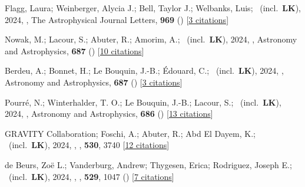 \item[{\color{numcolor}\scriptsize111}] Flagg, Laura; Weinberger, Alycia J.; Bell, Taylor J.; Welbanks, Luis; \etal\ (incl.\ \textbf{LK}), 2024, , The Astrophysical Journal Letters, \textbf{969} () [\href{https://ui.adsabs.harvard.edu/abs/2024ApJ...969L..19F}{3 citations}]

\item[{\color{numcolor}\scriptsize110}] Nowak, M.; Lacour, S.; Abuter, R.; Amorim, A.; \etal\ (incl.\ \textbf{LK}), 2024, , Astronomy and Astrophysics, \textbf{687} () [\href{https://ui.adsabs.harvard.edu/abs/2024A&A...687A.248N}{10 citations}]

\item[{\color{numcolor}\scriptsize109}] Berdeu, A.; Bonnet, H.; Le Bouquin, J.-B.; {\'E}douard, C.; \etal\ (incl.\ \textbf{LK}), 2024, , Astronomy and Astrophysics, \textbf{687} () [\href{https://ui.adsabs.harvard.edu/abs/2024A&A...687A.157B}{3 citations}]

\item[{\color{numcolor}\scriptsize108}] Pourr{\'e}, N.; Winterhalder, T. O.; Le Bouquin, J.-B.; Lacour, S.; \etal\ (incl.\ \textbf{LK}), 2024, , Astronomy and Astrophysics, \textbf{686} () [\href{https://ui.adsabs.harvard.edu/abs/2024A&A...686A.258P}{13 citations}]

\item[{\color{numcolor}\scriptsize107}] GRAVITY Collaboration; Foschi, A.; Abuter, R.; Abd El Dayem, K.; \etal\ (incl.\ \textbf{LK}), 2024, , \mnras, \textbf{530}, 3740 [\href{https://ui.adsabs.harvard.edu/abs/2024MNRAS.530.3740G}{12 citations}]

\item[{\color{numcolor}\scriptsize106}] de Beurs, Zo{\"e} L.; Vanderburg, Andrew; Thygesen, Erica; Rodriguez, Joseph E.; \etal\ (incl.\ \textbf{LK}), 2024, , \mnras, \textbf{529}, 1047 () [\href{https://ui.adsabs.harvard.edu/abs/2024MNRAS.529.1047D}{7 citations}]

